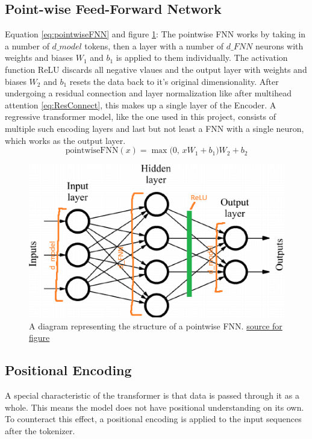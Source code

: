 \documentclass{article}
\begin{document}
\subsection{Point-wise Feed-Forward Network}
Equation \eqref{eq:pointwiseFNN} and figure \ref{fig:pointwiseFNN}:
The pointwise FNN works by taking in a number of $d\_model$ tokens, then a layer with a number of $d\_FNN$ neurons with weights and biases $W_1$ and $b_1$ is applied to them individually. The activation function ReLU discards all negative vlaues and the output layer with weights and biases $W_2$ and $b_1$ resets the data back to it's original dimensionality.
After undergoing a residual connection and layer normalization like after multihead attention \eqref{eq:ResConnect}, this makes up a single layer of the Encoder.
A regressive transformer model, like the one used in this project, consists of multiple such encoding layers and last but not least a FNN with a single neuron, which works as the output layer.
\begin{equation}
    \text{pointwiseFNN}(x) = \max\bigl(0, \, x W_1 + b_1 \bigr) W_2 + b_2 \label{eq:pointwiseFNN}
\end{equation}
\begin{figure}[htbp]
    \centering
    \includegraphics[width=0.4\paperwidth]{images/pointwiseFNN.png}
    \caption{A diagram representing the structure of a pointwise FNN. \href{https://datascience.stackexchange.com/questions/68020/what-is-the-feedforward-network-in-a-transformer-trained-on}{source for figure}}
    \label{fig:pointwiseFNN}
\end{figure}

\newpage

\subsection{Positional Encoding}
A special characteristic of the transformer is that data is passed through it as a whole. This means the model does not have positional understanding on its own. To counteract this effect, a positional encoding is applied to the input sequences after the tokenizer.
\end{document}
